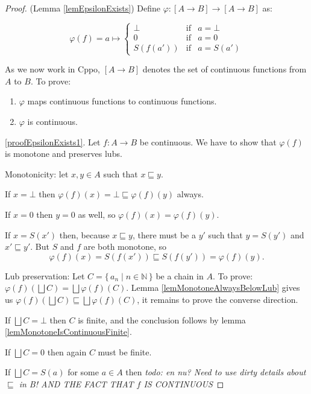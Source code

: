 \documentclass[a4paper]{article}
\newcommand{\below}{\sqsubseteq}
\newcommand{\arr}{\rightarrow}
\newcommand{\todo}[1]{\smallskip \noindent \emph{todo: #1} \smallskip}
\newcommand{\lub}{\bigsqcup}
\newcommand{\set}[1]{\{\,#1\,\}}
\newcommand{\bbN}{\mathbb{N}}
\begin{document}
\begin{proof}

(Lemma \ref{lemEpsilonExists}) Define $\varphi : [A \arr B] \arr [A \arr B]$ as:

\begin{equation*}
\varphi(f) = a \mapsto \left\{
  \begin{array}{rcl}
   \bot & \text{if} & a = \bot \\
   0 & \text{if} & a = 0 \\
   S(f(a')) & \text{if} & a = S(a')
  \end{array}
\right.
\end{equation*}

As we now work in Cppo, $[A \arr B]$ denotes the set of continuous functions
from $A$ to $B$. To prove:
\begin{enumerate}[noitemsep]
\item \label{proofEpsilonExists1} $\varphi$ maps continuous functions to
continuous functions.
\item \label{proofEpsilonExists2} $\varphi$ is continuous.
\end{enumerate}

\ref{proofEpsilonExists1}. Let $f : A \arr B$ be continuous. We have to show
that $\varphi(f)$ is monotone and preserves lubs.

Monotonicity: let $x, y \in A$ such that $x \below y$.

If $x = \bot$ then $\varphi(f)(x) = \bot \below \varphi(f)(y)$ always.

If $x = 0$ then $y = 0$ as well, so $\varphi(f)(x) = \varphi(f)(y)$.

If $x = S(x')$ then, because $x \below y$, there must be a $y'$ such that $y =
S(y')$ and $x' \below y'$. But $S$ and $f$ are both monotone, so
\begin{equation*}
\varphi(f)(x) = S(f(x')) \below S(f(y')) = \varphi(f)(y).
\end{equation*}

Lub preservation: Let $C = \set{a_n \mid n \in \bbN}$ be a chain in $A$. To
prove: $\varphi(f)(\lub C) = \lub \varphi(f)(C)$. Lemma
\ref{lemMonotoneAlwaysBelowLub} gives us $\varphi(f)(\lub C) \below \lub
\varphi(f)(C)$, it remains to prove the converse direction.

If $\lub C = \bot$ then $C$ is finite, and the conclusion follows by lemma
\ref{lemMonotoneIsContinuousFinite}.

If $\lub C = 0$ then again $C$ must be finite.

If $\lub C = S(a)$ for some $a \in A$ then \todo{en nu? Need to use dirty
details about $\below$ in B! AND THE FACT THAT $f$ IS CONTINUOUS}


\end{proof}
\end{document}
